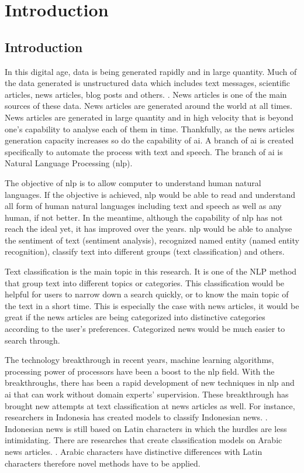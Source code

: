 \chapter{Introduction}
\section{Introduction}
In this digital age, data is being generated rapidly and in large quantity. Much of the data generated is unstructured data which includes text messages, scientific articles, news articles, blog posts and others. \cite{bigData}. News articles is one of the main sources of these data. News articles are generated around the world at all times. News articles are generated in large quantity and in high velocity that is beyond one's capability to analyse each of them in time. Thankfully, as the news articles generation capacity increases so do the capability of \ac{ai}. A branch of \ac{ai} is created specifically to automate the process with text and speech. The branch of \ac{ai} is Natural Language Processing (\ac{nlp}).

The objective of \ac{nlp} is to allow computer to understand human natural languages. If the objective is achieved, \ac{nlp} would be able to read and understand all form of human natural languages including text  and speech as well as any human, if not better. In the meantime, although the capability of \ac{nlp} has not reach the ideal yet, it has improved over the years. \Ac{nlp} would be able to analyse the sentiment of text (sentiment analysis), recognized named entity (named entity recognition), classify text into different groups (text classification) and others.

Text classification is the main topic in this research. It is one of the NLP method that group text into different topics or categories. This classification would be helpful for users to narrow down a search quickly, or to know the main topic of the text in a short time. This is especially the case with news articles, it would be great if the news articles are being categorized into distinctive categories according to the user's preferences. Categorized news would be much easier to search through.

The technology breakthrough in recent years, machine learning algorithms, processing power of processors have been a boost to the \ac{nlp} field. With the breakthroughs, there has been a rapid development of new techniques in \ac{nlp} and \ac{ai} that can work without domain experts' supervision. These breakthrough has brought new attempts at text classification at news articles as well. For instance, researchers in Indonesia has created models to classify Indonesian news. \cite{WONGSO2017137}. Indonesian news is still based on Latin characters in which the hurdles are less intimidating. There are researches that create classification models on Arabic news articles. \cite{arabicNews}. Arabic characters have distinctive differences with Latin characters therefore novel methods have to be applied.

